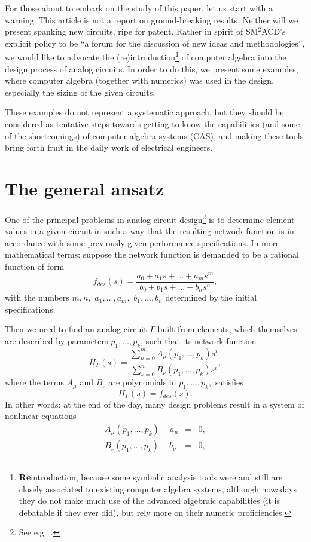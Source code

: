 \documentclass[10pt,twocolumn,pagenumbers]{IEEEtran}
\begin{document}
For those about to embark on the study of this paper, let us start with a warning: This article is not a report on ground-breaking results. Neither will we present spanking new circuits, ripe for patent. Rather in spirit of SM$^2$ACD's explicit policy to be ``a forum for the discussion of new ideas and methodologies'', we would like to advocate the \hbox{(re)}\-introduction\footnote{{\bf Re}introduction, because some symbolic analysis tools were and still are closely associated to existing computer algebra systems, although nowadays they do not make much use of the advanced algebraic capabilities (it is debatable if they ever did), but rely more on their numeric proficiencies.} of computer algebra into the design process of analog circuits. In order to do this, we present some examples, where computer algebra (together with numerics) was used in the design, especially the sizing of the given circuits.

These examples do not represent a systematic approach, but they should be considered as tentative steps towards getting to know the capabilities (and some of the shortcomings) of computer algebra systems (CAS), and making these tools bring forth fruit in the daily work of electrical engineers. 

\section{The general ansatz}

\noindent 
One of the principal problems in analog circuit design\footnote{See e.g.\ \cite{GielenSansen}.} is to determine element values in a given circuit in such a way that the resulting network function is in accordance with some previously given performance specifications. In more mathematical terms: suppose the network function is demanded to be a rational function of form
\begin{equation}
f_{des}(s)  =  \frac{a_0+a_1s+\dots+a_m s^m}{b_0+b_1s+\dots+b_{n}s^{n}},
\end{equation}
\noindent
with the numbers $m, n,$ $a_1,\dots,a_{m},$ $b_1,\dots,b_n$ determined by the initial specifications. 

Then we need to find an analog circuit $\Gamma$ built from elements, which themselves are described by parameters $p_1,\dots,p_k$, such that its network function
\begin{equation}
H_\Gamma(s)  =  
\frac{\sum_{\mu=0}^{m}A_\mu(p_1,\dots,p_k) s^i}
{\sum_{\nu=0}^{n}B_\nu(p_1,\dots,p_k) s^i},
\end{equation}
\noindent
where the terms $A_\mu$ and $B_\nu$ are polynomials in $p_1,\dots,p_k,$
satisfies
\begin{equation}
H_\Gamma(s) = f_{des}(s).
\end{equation}
\noindent
In other words: at the end of the day, many design problems result in a system of nonlinear equations
\begin{equation}
\begin{aligned}
A_\mu(p_1,\dots,p_k) - a_\mu & = & 0,\\
B_\nu(p_1,\dots,p_k) - b_\nu & = & 0,
\label{DesignProblem}
\end{aligned}
\end{equation}
\end{document}
